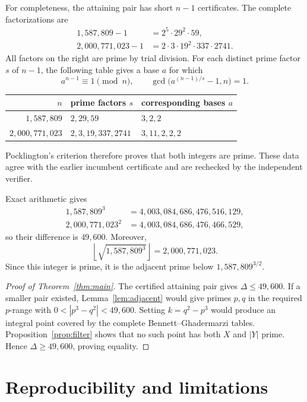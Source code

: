 \documentclass[11pt]{amsart}
\theoremstyle{remark}
\begin{document}
For completeness, the attaining pair has short $n-1$ certificates.  The
complete factorizations are
\begin{align*}
 1{,}587{,}809-1&=2^5\cdot29^2\cdot59,\\
 2{,}000{,}771{,}023-1&=2\cdot3\cdot19^2\cdot337\cdot2741.
\end{align*}
All factors on the right are prime by trial division.  For each distinct
prime factor $s$ of $n-1$, the following table gives a base $a$ for which
\[
 a^{n-1}\equiv1\pmod n,
 \qquad
 \gcd\bigl(a^{(n-1)/s}-1,n\bigr)=1.
\]
\begin{center}
\begin{tabular}{rll}
\toprule
$n$ & prime factors $s$ & corresponding bases $a$ \\
\midrule
$1{,}587{,}809$ & $2,29,59$ & $3,2,2$ \\
$2{,}000{,}771{,}023$ & $2,3,19,337,2741$ & $3,11,2,2,2$ \\
\bottomrule
\end{tabular}
\end{center}
Pocklington's criterion \cite{Pocklington1914} therefore proves that both
integers are prime.  These data agree with the earlier incumbent certificate
\cite{TheoremDBR560} and are rechecked by the independent verifier.

Exact arithmetic gives
\begin{align*}
 1{,}587{,}809^3&=4{,}003{,}084{,}686{,}476{,}516{,}129,\\
 2{,}000{,}771{,}023^2&=4{,}003{,}084{,}686{,}476{,}466{,}529,
\end{align*}
so their difference is $49{,}600$.  Moreover,
\[
 \left\lfloor\sqrt{1{,}587{,}809^3}\right\rfloor
 =2{,}000{,}771{,}023.
\]
Since this integer is prime, it is the adjacent prime below
$1{,}587{,}809^{3/2}$.

\begin{proof}[Proof of Theorem~\ref{thm:main}]
The certified attaining pair gives $\Delta\le49{,}600$.  If a smaller pair
existed, Lemma~\ref{lem:adjacent} would give primes $p,q$ in the required
$p$-range with $0<|p^3-q^2|<49{,}600$.  Setting $k=q^2-p^3$ would produce an
integral point covered by the complete Bennett--Ghadermarzi tables.
Proposition~\ref{prop:filter} shows that no such point has both $X$ and $|Y|$
prime.  Hence $\Delta\ge49{,}600$, proving equality.
\end{proof}

\section{Reproducibility and limitations}
\end{document}
